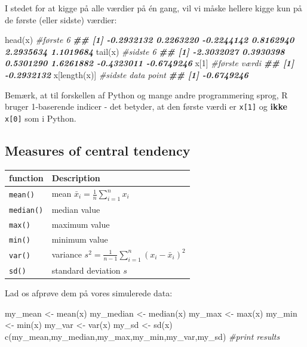 \documentclass[
]{book}
\newenvironment{Shaded}{\begin{snugshade}}{\end{snugshade}}
\newcommand{\CommentTok}[1]{\textcolor[rgb]{0.56,0.35,0.01}{\textit{#1}}}
\newcommand{\DecValTok}[1]{\textcolor[rgb]{0.00,0.00,0.81}{#1}}
\newcommand{\DocumentationTok}[1]{\textcolor[rgb]{0.56,0.35,0.01}{\textbf{\textit{#1}}}}
\newcommand{\FunctionTok}[1]{\textcolor[rgb]{0.00,0.00,0.00}{#1}}
\newcommand{\NormalTok}[1]{#1}
\newcommand{\OtherTok}[1]{\textcolor[rgb]{0.56,0.35,0.01}{#1}}
\begin{document}
I stedet for at kigge på alle værdier på én gang, vil vi måske hellere kigge kun på de første (eller sidste) værdier:

\begin{Shaded}
\begin{Highlighting}[]
\FunctionTok{head}\NormalTok{(x) }\CommentTok{\#første 6}
\DocumentationTok{\#\# [1] {-}0.2932132  0.2263220 {-}0.2244142  0.8162940  2.2935634  1.1019684}
\FunctionTok{tail}\NormalTok{(x) }\CommentTok{\#sidste 6}
\DocumentationTok{\#\# [1] {-}2.3032027  0.3930398  0.5301290  1.6261882 {-}0.4323011 {-}0.6749246}
\NormalTok{x[}\DecValTok{1}\NormalTok{] }\CommentTok{\#første værdi}
\DocumentationTok{\#\# [1] {-}0.2932132}
\NormalTok{x[}\FunctionTok{length}\NormalTok{(x)] }\CommentTok{\#sidste data point}
\DocumentationTok{\#\# [1] {-}0.6749246}
\end{Highlighting}
\end{Shaded}

Bemærk, at til forskellen af Python og mange andre programmering sprog, R bruger 1-baserende indicer - det betyder, at den første værdi er \texttt{x{[}1{]}} og \textbf{ikke} \texttt{x{[}0{]}} som i Python.

\hypertarget{measures-of-central-tendency}{%
\subsection{Measures of central tendency}\label{measures-of-central-tendency}}

\begin{longtable}[]{@{}ll@{}}
\toprule
function & Description \\
\midrule
\endhead
\texttt{mean()} & mean \(\bar{x}_{i} = \frac{1}{n}\sum_{i=1}^{n} x_{i}\) \\
\texttt{median()} & median value \\
\texttt{max()} & maximum value \\
\texttt{min()} & minimum value \\
\texttt{var()} & variance \(s^2 = \frac{1}{n-1}\sum_{i=1}^{n} (x_{i} - \bar{x}_{i})^2\) \\
\texttt{sd()} & standard deviation \(s\) \\
\bottomrule
\end{longtable}

Lad os afprøve dem på vores simulerede data:

\begin{Shaded}
\begin{Highlighting}[]
\NormalTok{my\_mean }\OtherTok{\textless{}{-}} \FunctionTok{mean}\NormalTok{(x)}
\NormalTok{my\_median }\OtherTok{\textless{}{-}} \FunctionTok{median}\NormalTok{(x)}
\NormalTok{my\_max }\OtherTok{\textless{}{-}} \FunctionTok{max}\NormalTok{(x)}
\NormalTok{my\_min }\OtherTok{\textless{}{-}} \FunctionTok{min}\NormalTok{(x)}
\NormalTok{my\_var }\OtherTok{\textless{}{-}} \FunctionTok{var}\NormalTok{(x)}
\NormalTok{my\_sd }\OtherTok{\textless{}{-}} \FunctionTok{sd}\NormalTok{(x)}
\FunctionTok{c}\NormalTok{(my\_mean,my\_median,my\_max,my\_min,my\_var,my\_sd) }\CommentTok{\#print results}
\end{Highlighting}
\end{Shaded}
\end{document}

